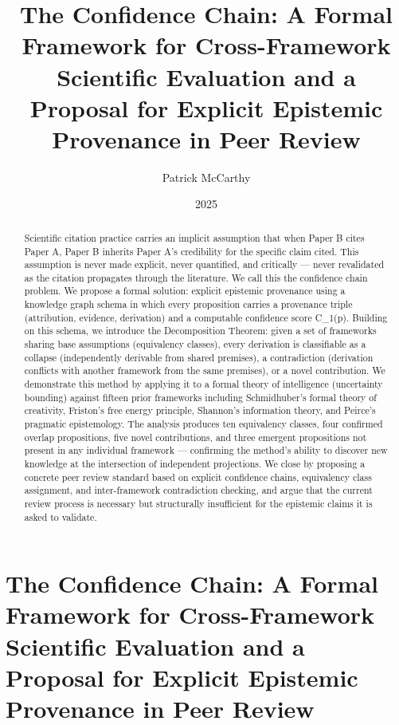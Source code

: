 \documentclass[
]{article}
\title{The Confidence Chain: A Formal Framework for Cross-Framework
Scientific Evaluation and a Proposal for Explicit Epistemic Provenance
in Peer Review}
\author{Patrick McCarthy}
\date{2025}
\begin{document}
\maketitle
\begin{abstract}
Scientific citation practice carries an implicit assumption that when
Paper B cites Paper A, Paper B inherits Paper A's credibility for the
specific claim cited. This assumption is never made explicit, never
quantified, and critically --- never revalidated as the citation
propagates through the literature. We call this the confidence chain
problem. We propose a formal solution: explicit epistemic provenance
using a knowledge graph schema in which every proposition carries a
provenance triple (attribution, evidence, derivation) and a computable
confidence score C\_1(p). Building on this schema, we introduce the
Decomposition Theorem: given a set of frameworks sharing base
assumptions (equivalency classes), every derivation is classifiable as a
collapse (independently derivable from shared premises), a contradiction
(derivation conflicts with another framework from the same premises), or
a novel contribution. We demonstrate this method by applying it to a
formal theory of intelligence (uncertainty bounding) against fifteen
prior frameworks including Schmidhuber's formal theory of creativity,
Friston's free energy principle, Shannon's information theory, and
Peirce's pragmatic epistemology. The analysis produces ten equivalency
classes, four confirmed overlap propositions, five novel contributions,
and three emergent propositions not present in any individual framework
--- confirming the method's ability to discover new knowledge at the
intersection of independent projections. We close by proposing a
concrete peer review standard based on explicit confidence chains,
equivalency class assignment, and inter-framework contradiction
checking, and argue that the current review process is necessary but
structurally insufficient for the epistemic claims it is asked to
validate.
\end{abstract}

\section{The Confidence Chain: A Formal Framework for Cross-Framework
Scientific Evaluation and a Proposal for Explicit Epistemic Provenance
in Peer
Review}\label{the-confidence-chain-a-formal-framework-for-cross-framework-scientific-evaluation-and-a-proposal-for-explicit-epistemic-provenance-in-peer-review}
\end{document}
